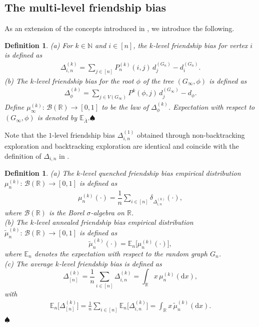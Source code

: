 \documentclass[11pt]{article}
\numberwithin{equation}{section}
\theoremstyle{plain}
\newtheorem{definition}[theorem]{Definition}
\newcommand{\N}{\mathbb N}
\newcommand{\R}{\mathbb R}
\newcommand{\dd}{\mathrm{d}}
\newcommand{\E}{\mathbb E}
\begin{document}

\subsection{The multi-level friendship bias}
\label{subsec:MLFB}

As an extension of the concepts introduced in \cite{HHP}, we introduce the following.

\begin{definition}\label{FBdef}
{\rm (a) For $k\in\N$ and $i \in [n]$, the \emph{$k$-level friendship bias} for vertex $i$ is defined as
\begin{align*}
\Delta_{i,n}^{(k)} = \sum_{j \in [n]} P_{n}^{(k)}(i,j) \,d_{j}^{(G_{n})} - d_{i}^{(G_{n})}.
\end{align*}
(b) The $k$-level friendship bias for the root $\phi$ of the tree $(G_{\infty},\phi)$ is defined as
\begin{align*}
\Delta_{\phi}^{(k)} = \sum_{j\in V(G_{\infty})} P^{k}(\phi, j)\, d^{(G_\infty)}_{j}-d_{\phi}.
\end{align*}
Define $\mu^{(k)}_{\infty}\colon\,\mathcal{B}(\R) \to [0,1]$ to be the law of $\Delta_{\phi}^{(k)}$. Expectation with respect to $(G_{\infty},\phi)$ is denoted by $\mathbb{E}_{\bar{\Lambda}}$.}\hfill$\spadesuit$
\end{definition}

\noindent
Note that the $1$-level friendship bias $\Delta_{i,n}^{(1)}$ obtained through non-backtracking exploration and backtracking exploration are identical and coincide with the definition of $\Delta_{i,n}$ in \cite{HHP}.

\begin{definition}\label{FBdef1}
{\rm (a) The \emph{$k$-level quenched friendship bias empirical distribution} $\mu_{n}^{(k)}\colon\,\mathcal{B}(\R) \to [0,1]$ is defined as
\begin{align*}
\mu_{n}^{(k)}(\cdot) = \dfrac{1}{n}\sum_{i \in [n]} \delta_{\Delta_{i,n}^{(k)}}(\cdot),
\end{align*}
where $\mathcal{B}(\R)$ is the Borel $\sigma$-algebra on $\R$.\\ 
(b)  The \emph{$k$-level annealed friendship bias empirical distribution} $\tilde{\mu}_{n}^{(k)}\colon\,\mathcal{B}(\R) \to [0,1]$ is defined as
\begin{equation*}
\tilde{\mu}_{n}^{(k)}(\cdot) = \E_{n}\big[\mu_{n}^{(k)}(\cdot)\big],
\end{equation*}
where $\E_{n}$ denotes the expectation with respect to the random graph $G_{n}$.\\ 
(c) The \emph{average $k$-level friendship bias} is defined as
\begin{equation*}
\Delta_{[n]}^{(k)} = \frac{1}{n} \sum_{i \in [n]} \Delta_{i,n}^{(k)} = \int_{\R} x\,\mu_{n}^{(k)}(\dd x), 
\end{equation*}
with 
\begin{align*}
\E_{n}\big[\Delta_{[n]}^{(k)}\big] = \frac{1}{n}\sum_{i \in [n]} \E_{n}\big[\Delta_{i,n}^{(k)}\big] 
= \int_{\R} x\,\tilde{\mu}_{n}^{(k)}(\dd x).
\end{align*}
}\hfill$\spadesuit$
\end{definition}
\end{document}
